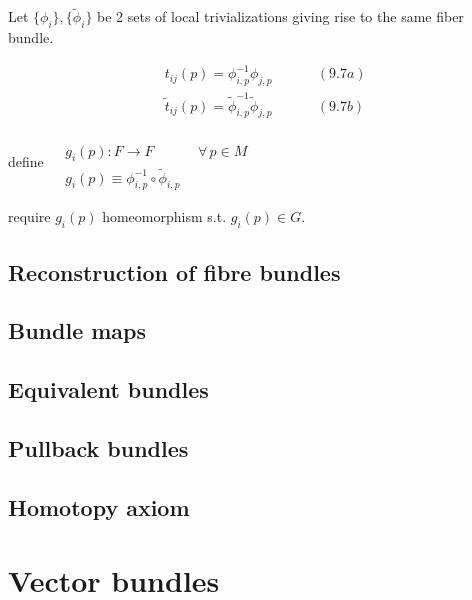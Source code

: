 \documentclass{book}
\begin{document}
Let $\lbrace \phi_i \rbrace, \lbrace \widetilde{\phi}_i \rbrace$ be 2 sets of local trivializations giving rise to the same fiber bundle.  

\[
\begin{aligned}
  & t_{ij}(p) = \phi^{-1}_{i,p} \phi_{j,p}  \quad \quad \quad \, (9.7a) \\ 
  & \widetilde{t}_{ij}(p) = \widetilde{\phi}^{-1}_{i,p} \widetilde{\phi}_{j,p} \quad \quad \quad \, (9.7b)
\end{aligned}
\]

define $\begin{aligned} & \quad \quad \\ 
  & g_i(p) : F \to F \quad \quad \quad \, \forall \, p \in M \\ 
  & g_i(p) \equiv \phi^{-1}_{i,p} \circ \widetilde{\phi}_{i,p} \end{aligned}$

require $g_i(p)$ homeomorphism s.t. $g_i(p) \in G$.  



\subsection{ Reconstruction of fibre bundles }


\subsection{ Bundle maps }


\subsection{ Equivalent bundles }


\subsection{ Pullback bundles }



\subsection{ Homotopy axiom }





\section{ Vector bundles }
\end{document}
